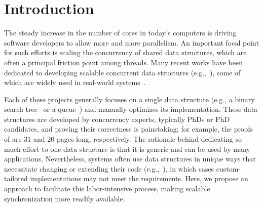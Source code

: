 
\section{Introduction} \label{sec:intro}

The steady increase in the number of cores in today's computers is driving software developers to allow more and more parallelism.
An important focal point for such efforts is scaling the concurrency of shared data structures, which are often a principal friction point among threads.
Many recent works have been dedicated to developing scalable concurrent data
structures (e.g.,~\cite{ArbelA2014,DrachslerVY2014,NatarajanM2014,BrownER2014,CrainGR2013,BraginskyP2012,
AfekKKMT2012,EllenFRB2010,BronsonCCO2010,HerlihyLLS2007,fraser2004practical,Michael:1996}),
some of which are widely used in real-world systems~\cite{Ohad:OOPSLA11}.

Each of these projects generally focuses on a single data
structure (e.g., a binary search tree~\cite{BronsonCCO2010} or a queue~\cite{Michael:1996}) and manually optimizes its implementation. These data structures are developed by concurrency experts, typically PhDs or PhD candidates, and
proving their correctness is painstaking;
for example, the proofs of \cite{BraginskyP2012,EllenFRB2010} are $31$ and $20$ pages long,
respectively.
The rationale behind dedicating so much effort to one data structure is that it is
generic and can be used by many applications. Nevertheless,  systems often use data structures in unique ways
that necessitate changing or extending their code (e.g.,~\cite{levelDB,jmonkey,OhadThesis,zyulkyarov2009atomic}), in which cases custom-tailored
implementations may not meet the requirements. 
Here, we propose an approach to facilitate this labor-intensive process,
making scalable synchronization more readily available.

